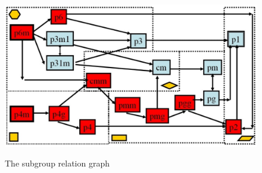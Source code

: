 \begin{figure}[!ht]
\centering
\includegraphics[width=0.9\columnwidth]{Yanxi_Graph}
\label{graph}
\caption{The subgroup relation graph}
\end{figure}